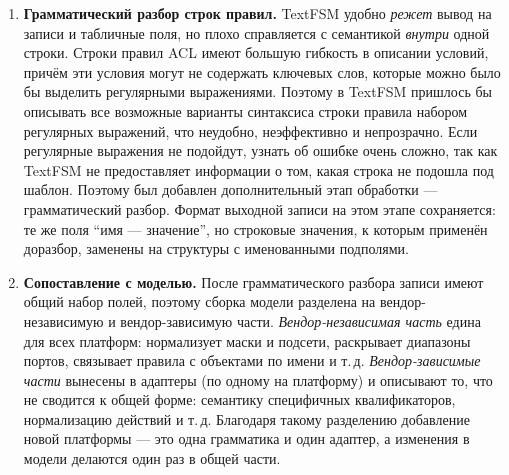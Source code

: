 \begin{enumerate}
    Альтернативные подходы рассматривались и были отвергнуты. Разбор регулярными выражениями напрямую, без модели состояний, плохо масштабируется на многострочные записи и быстро теряет читаемость. Написание парсера для каждой команды вручную дорого в сопровождении и не даёт такой гибкости подстройки для конкретной инфраструктуры. Полноценный грамматический разбор всего вывода (через лексер и парсер) на этом уровне избыточен: структура вывода большинства команд проста и хорошо ложится на конечный автомат, а тяжёлый аппарат грамматик целесообразно применять только там, где он действительно нужен --- внутри отдельных строк со сложным синтаксисом. Этот этап был реализован на основе TextFSM-шаблонов.

    На выходе этого этапа вывод каждой команды превращается в список записей, где каждая запись --- набор полей ``имя --- значение''; часть значений уже атомарна (числа, имена), часть остаётся строками, требующими дальнейшего разбора.

    \item \textbf{Грамматический разбор строк правил.} TextFSM удобно \emph{режет} вывод на записи и табличные поля, но плохо справляется с семантикой \emph{внутри} одной строки. Строки правил ACL имеют большую гибкость в описании условий, причём эти условия могут не содержать ключевых слов, которые можно было бы выделить регулярными выражениями. Поэтому в TextFSM пришлось бы описывать все возможные варианты синтаксиса строки правила набором регулярных выражений, что неудобно, неэффективно и непрозрачно.
    Если регулярные выражения не подойдут, узнать об ошибке очень сложно, так как TextFSM не предоставляет информации о том, какая строка не подошла под шаблон. Поэтому был добавлен дополнительный этап обработки --- грамматический разбор. Формат выходной записи на этом этапе сохраняется: те же поля ``имя --- значение'', но строковые значения, к которым применён доразбор, заменены на структуры с именованными подполями.

    \item \textbf{Сопоставление с моделью.} После грамматического разбора записи имеют общий набор полей, поэтому сборка модели разделена на вендор-независимую и вендор-зависимую части. \emph{Вендор-независимая часть} едина для всех платформ: нормализует маски и подсети, раскрывает диапазоны портов, связывает правила с объектами по имени и т.\,д. \emph{Вендор-зависимые части} вынесены в адаптеры (по одному на платформу) и описывают то, что не сводится к общей форме: семантику специфичных квалификаторов, нормализацию действий и т.\,д. Благодаря такому разделению добавление новой платформы --- это одна грамматика и один адаптер, а изменения в модели делаются один раз в общей части.
\end{enumerate}

